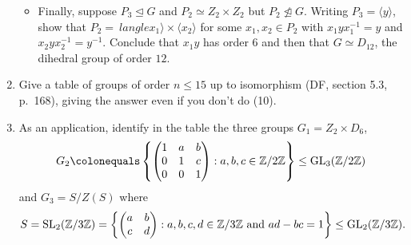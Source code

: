 \documentclass[11pt, reqno]{amsart}
\begin{document}
\begin{enumerate}
\begin{itemize}
\item Finally, suppose $P_3 \trianglelefteq G$ and $P_2 \simeq Z_2 \times Z_2$ but 
$P_2 \not\trianglelefteq G$.  Writing $P_3 = \langle y \rangle$, show that $P_2 = \
langle x_1 \rangle \times \langle x_2 \rangle$ for some $x_1,x_2 \in P_2$ with 
$x_1yx_1^{-1}=y$ and $x_2yx_2^{-1}=y^{-1}$.  Conclude that $x_1y$ has order $6$ and
then that $G \simeq D_{12}$, the dihedral group of order $12$.   
\end{itemize}
\item Give a table of groups of order $n\leq 15$ up to isomorphism (DF, section 
5.3, p.~168), giving the answer even if you don't do (10).
\item As an application, identify in the table the three groups $G_1=Z_2 \times 
D_6$, 
\[ G_2 \colonequals
  \left\{ \begin{pmatrix}
    1 & a & b \\
    0 & 1 & c \\
    0 & 0 & 1
  \end{pmatrix} : a,b,c \in \Z/2\Z \right\} \leq \GL_3(\Z/2\Z) \]
and $G_3=S/Z(S)$ where  
\[ S=\operatorname{SL}_2(\mathbb{Z}/3\mathbb{Z})=\left\{ \begin{pmatrix} a & b \\ c & d \end{pmatrix} : a,b,c,d
\in \mathbb{Z}/3\mathbb{Z} \text{ and } ad-bc=1 \right\} \leq \mathrm{GL}_2(\mathbb{Z}/3\mathbb{Z}). \]
\end{enumerate}
\end{document}
